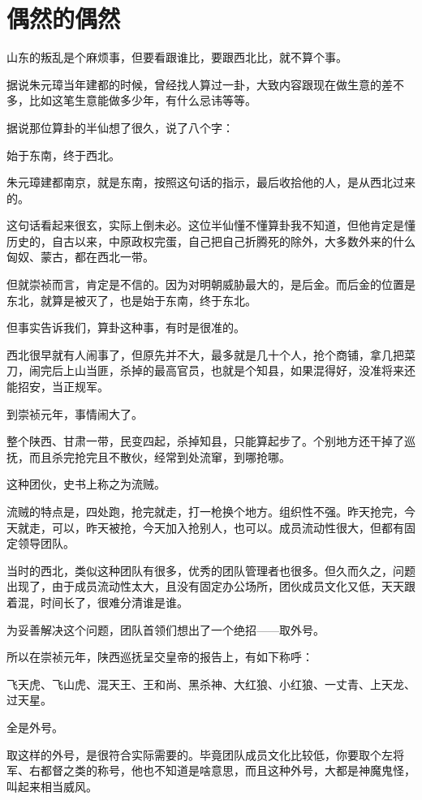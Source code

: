 \section{偶然的偶然}
\ifnum{}
	\begin{multicols}{\theparacolNo}
		\fi
		山东的叛乱是个麻烦事，但要看跟谁比，要跟西北比，就不算个事。

		据说朱元璋当年建都的时候，曾经找人算过一卦，大致内容跟现在做生意的差不多，比如这笔生意能做多少年，有什么忌讳等等。

		据说那位算卦的半仙想了很久，说了八个字：

		始于东南，终于西北。

		朱元璋建都南京，就是东南，按照这句话的指示，最后收拾他的人，是从西北过来的。

		这句话看起来很玄，实际上倒未必。这位半仙懂不懂算卦我不知道，但他肯定是懂历史的，自古以来，中原政权完蛋，自己把自己折腾死的除外，大多数外来的什么匈奴、蒙古，都在西北一带。

		但就崇祯而言，肯定是不信的。因为对明朝威胁最大的，是后金。而后金的位置是东北，就算是被灭了，也是始于东南，终于东北。

		但事实告诉我们，算卦这种事，有时是很准的。

		西北很早就有人闹事了，但原先并不大，最多就是几十个人，抢个商铺，拿几把菜刀，闹完后上山当匪，杀掉的最高官员，也就是个知县，如果混得好，没准将来还能招安，当正规军。

		到崇祯元年，事情闹大了。

		整个陕西、甘肃一带，民变四起，杀掉知县，只能算起步了。个别地方还干掉了巡抚，而且杀完抢完且不散伙，经常到处流窜，到哪抢哪。

		这种团伙，史书上称之为流贼。

		流贼的特点是，四处跑，抢完就走，打一枪换个地方。组织性不强。昨天抢完，今天就走，可以，昨天被抢，今天加入抢别人，也可以。成员流动性很大，但都有固定领导团队。

		当时的西北，类似这种团队有很多，优秀的团队管理者也很多。但久而久之，问题出现了，由于成员流动性太大，且没有固定办公场所，团伙成员文化又低，天天跟着混，时间长了，很难分清谁是谁。

		为妥善解决这个问题，团队首领们想出了一个绝招——取外号。

		所以在崇祯元年，陕西巡抚呈交皇帝的报告上，有如下称呼：

		飞天虎、飞山虎、混天王、王和尚、黑杀神、大红狼、小红狼、一丈青、上天龙、过天星。

		全是外号。

		取这样的外号，是很符合实际需要的。毕竟团队成员文化比较低，你要取个左将军、右都督之类的称号，他也不知道是啥意思，而且这种外号，大都是神魔鬼怪，叫起来相当威风。


\end{multicols}
